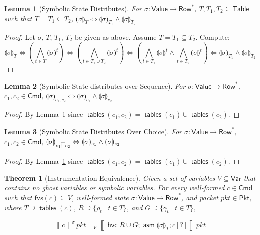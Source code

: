 \documentclass{article}
\newcommand{\pkt}{\mathit{pkt}}
\newcommand{\denote}[1]{\left\llbracket#1\right\rrbracket}
\newcommand{\Value}{\mathsf{Value}}
\newcommand{\Cmd}{\mathsf{Cmd}}
\newcommand{\Pkt}{\mathsf{Pkt}}
\newcommand{\Table}{\mathsf{Table}}
\newcommand{\Row}{\mathsf{Row}}
\newcommand{\Var}{\mathsf{Var}}
\newcommand{\assume}{\mathop{\mathsf{asm}}}
\newcommand{\choiceop}{\rotatebox[origin=c]{90}{$\sqsubset\!\!\!\sqsupset$}}
\newcommand{\choice}{\mathbin{\choiceop}}
\newcommand{\havoc}[1]{\mathop{\mathsf{hvc}}#1}
\newcommand{\state}[1]{\llparenthesis#1\rrparenthesis}
\newcommand{\instr}{[?]}
\newcommand{\fvs}{\textrm{fvs}}
\newcommand{\tables}{\mathop{\mathsf{tables}}}
\theoremstyle{plain}
\newtheorem{theorem}{Theorem}
\newtheorem{lemma}{Lemma}
\theoremstyle{definition}
\theoremstyle{remark}
\begin{document}
\begin{lemma}[Symbolic State Distributes]
  \label{lem:sigma-distrib}
  For $\sigma : \Value \to \Row^*$, $T,T_1,T_2 \subseteq \Table$ such that $T = T_1 \subseteq T_2$,
  $\state\sigma_{T} \Leftrightarrow \state{\sigma}_{T_1}\wedge\state{\sigma}_{T_2}$
\end{lemma}

\begin{proof}
  Let $\sigma$, $T$, $T_1$, $T_2$ be given as above. Assume $T = T_1 \subseteq T_2$.
  Compute:
  \[\state\sigma_T\Leftrightarrow
  \left(\bigwedge_{t \in T} \state\sigma^t\right) \Leftrightarrow
  \left(\bigwedge_{t \in T_1 \cup T_2} \state\sigma^t\right) \Leftrightarrow
  \left(\bigwedge_{t \in T_1} \state\sigma^t \wedge \bigwedge_{t \in T_2}\state\sigma^t \right) \Leftrightarrow
  \state\sigma_{T_1} \wedge \state\sigma_{T_2}
  \]

\end{proof}


\begin{lemma}[Symbolic State distributes over Sequence]
  \label{lem:sigma-distrib-seq}
  For $\sigma : \Value \to \Row^*$, $c_1,c_2 \in \Cmd$,
  $\state\sigma_{c_1;c_2} \Leftrightarrow \state{\sigma}_{c_1}\wedge\state{\sigma}_{c_2}$
\end{lemma}

\begin{proof}
  By Lemma~\ref{lem:sigma-distrib} since $\tables(c_1;c_2) = \tables(c_1) \cup \tables(c_2)$.
\end{proof}

\begin{lemma}[Symbolic State Distributes Over Choice]
  \label{lem:sigma-distrib-choice}
  For $\sigma : \Value \to \Row^*$, $c_1,c_2 \in \Cmd$,
  $\state\sigma_{c_1 \choice c_2} \Leftrightarrow \state{\sigma}_{c_1}\wedge\state{\sigma}_{c_2}$
\end{lemma}

\begin{proof}
  By Lemma~\ref{lem:sigma-distrib} since $\tables(c_1;c_2) = \tables(c_1) \cup \tables(c_2)$.
\end{proof}


\begin{samepage}
\begin{theorem}[Instrumentation Equivalence]
  \label{thm:instr-equiv}
  Given a set of variables $V \subseteq \Var$ that contains no ghost variables
  or symbolic variables. For every well-formed $c \in \Cmd$ such that $\fvs(c) \subseteq V$,
  well-formed state $\sigma : \Value \to \Row^*$, and packet $\pkt \in \Pkt$,
  where $T \supseteq \tables(c)$, $R \supseteq \{\rho_t \mid t \in T\}$, and $G \supseteq \{\gamma_t \mid t \in
  T\}$,

  \[\denote{c}^\sigma\,\pkt =_V \denote{\havoc {R \cup G}; \assume{\state\sigma}_T; c\instr}\,\pkt  \]
\end{theorem}
\end{samepage}
\end{document}
